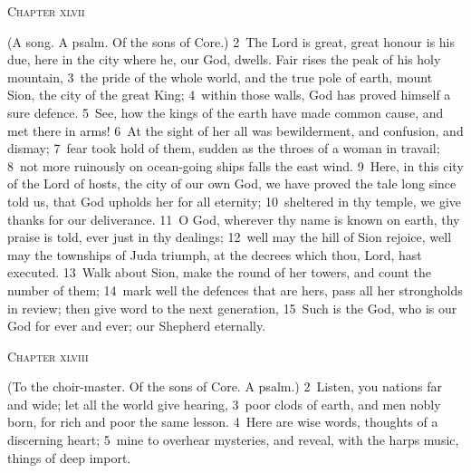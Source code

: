 \documentclass[10pt]{book} %
\begin{document}
\begin{large}\begin{center}\textsc{Chapter xlvii}\end{center}\end{large}
(A song. A psalm. Of the sons of Core.)
\textcolor{benred8}{2}~The Lord is great, great honour is his due, here in the city where he, our God, dwells. Fair rises the peak of his holy mountain, \textcolor{benred8}{3}~the pride of the whole world, and the true pole of earth, mount Sion, the city of the great King; \textcolor{benred8}{4}~within those walls, God has proved himself a sure defence. \textcolor{benred8}{5}~See, how the kings of the earth have made common cause, and met there in arms! \textcolor{benred8}{6}~At the sight of her all was bewilderment, and confusion, and dismay; \textcolor{benred8}{7}~fear took hold of them, sudden as the throes of a woman in travail; \textcolor{benred8}{8}~not more ruinously on ocean-going ships falls the east wind. \textcolor{benred8}{9}~Here, in this city of the Lord of hosts, the city of our own God, we have proved the tale long since told us, that God upholds her for all eternity; \textcolor{benred8}{10}~sheltered in thy temple, we give thanks for our deliverance. \textcolor{benred8}{11}~O God, wherever thy name is known on earth, thy praise is told, ever just in thy dealings; \textcolor{benred8}{12}~well may the hill of Sion rejoice, well may the townships of Juda triumph, at the decrees which thou, Lord, hast executed. \textcolor{benred8}{13}~Walk about Sion, make the round of her towers, and count the number of them; \textcolor{benred8}{14}~mark well the defences that are hers, pass all her strongholds in review; then give word to the next generation, \textcolor{benred8}{15}~Such is the God, who is our God for ever and ever; our Shepherd eternally.
\begin{large}\begin{center}\textsc{Chapter xlviii}\end{center}\end{large}
(To the choir-master. Of the sons of Core. A psalm.)
\textcolor{benred8}{2}~Listen, you nations far and wide; let all the world give hearing, \textcolor{benred8}{3}~poor clods of earth, and men nobly born, for rich and poor the same lesson. \textcolor{benred8}{4}~Here are wise words, thoughts of a discerning heart; \textcolor{benred8}{5}~mine to overhear mysteries, and reveal, with the harp\textquotesingle s music, things of deep import.
\end{document}
